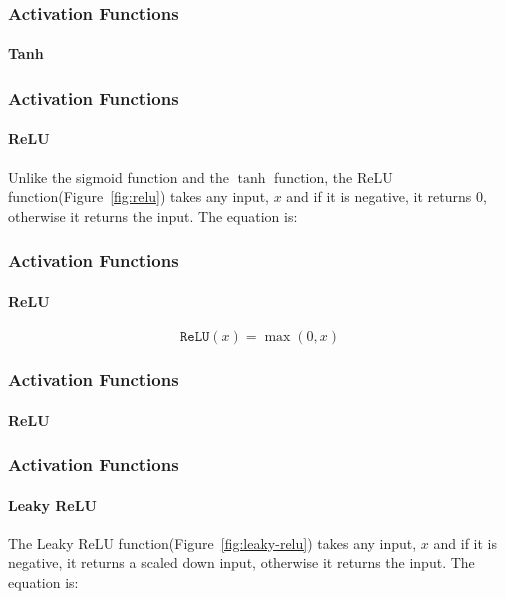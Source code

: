 \documentclass{beamer}
\begin{document}
\begin{frame}
\frametitle{Activation Functions}
\framesubtitle{Tanh}
\begin{figure}[h!]
    \begin{center}
    \end{center}
\end{figure}
\end{frame}

\begin{frame}
\frametitle{Activation Functions}
\framesubtitle{ReLU}
Unlike the sigmoid function and the $\tanh$ function, the ReLU function(Figure~\ref{fig:relu}) takes any input, $x$ and if it is negative, it returns 0, otherwise it returns the input. The equation is:
\end{frame}

\begin{frame}
\frametitle{Activation Functions}
\framesubtitle{ReLU}
\begin{equation}
    \texttt{ReLU}(x) = \max(0, x)
    \label{eq:relu}
\end{equation}
\end{frame}

\begin{frame}
\frametitle{Activation Functions}
\framesubtitle{ReLU}
\begin{figure}[h!]
    \begin{center}
    \end{center}
\end{figure}
\end{frame}

\begin{frame}
\frametitle{Activation Functions}
\framesubtitle{Leaky ReLU}
The Leaky ReLU function(Figure~\ref{fig:leaky-relu}) takes any input, $x$ and if it is negative, it returns a scaled down input, otherwise it returns the input. The equation is:
\end{frame}
\end{document}
